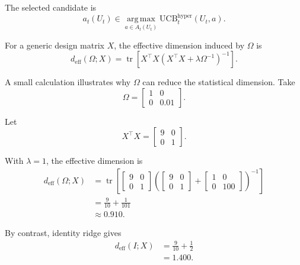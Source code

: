 \documentclass{article} %
\begin{document}
The selected candidate is
\begin{equation}
\label{eq:hyper-action}
a_t(U_t)
\in
\operatorname*{arg\,max}_{a\in A_t(U_t)}
\mathrm{UCB}_{t}^{\mathrm{hyper}}(U_t,a).
\end{equation}

For a generic design matrix \(X\), the effective dimension induced by \(\Omega\) is
\begin{equation}
\label{eq:hyper-deff-app}
d_{\mathrm{eff}}(\Omega;X)
=
\operatorname{tr}
\!\left[
X^\top X
\left(
X^\top X+\lambda\Omega^{-1}
\right)^{-1}
\right].
\end{equation}

A small calculation illustrates why \(\Omega\) can reduce the statistical dimension.  Take
\begin{equation}
\label{eq:hyper-example-omega}
\Omega=
\begin{bmatrix}
1&0\\
0&0.01
\end{bmatrix}.
\end{equation}

Let
\begin{equation}
\label{eq:hyper-example-xtx}
X^\top X=
\begin{bmatrix}
9&0\\
0&1
\end{bmatrix}.
\end{equation}

With \(\lambda=1\), the effective dimension is
\begin{align}
\label{eq:hyper-example-deff-app}
d_{\mathrm{eff}}(\Omega;X)
&=
\operatorname{tr}
\left[
\begin{bmatrix}
9&0\\
0&1
\end{bmatrix}
\left(
\begin{bmatrix}
9&0\\
0&1
\end{bmatrix}
+
\begin{bmatrix}
1&0\\
0&100
\end{bmatrix}
\right)^{-1}
\right]
\\
&=
\frac{9}{10}+\frac{1}{101}
\\
&\approx
0.910 .
\end{align}

By contrast, identity ridge gives
\begin{align}
\label{eq:hyper-example-identity}
d_{\mathrm{eff}}(I;X)
&=
\frac{9}{10}+\frac{1}{2}
\\
&=
1.400 .
\end{align}
\end{document}
